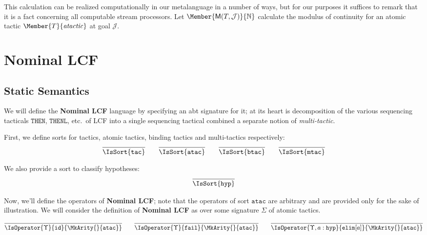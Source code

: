 This calculation can be realized computationally in our metalanguage in a
number of ways, but for our purposes it suffices to remark that it is a fact
concerning all computable stream processors. Let
$\Member{\ModC{T}{\mathcal{J}}}{\MLNat}$ calculate the modulus of continuity
for an atomic tactic $\Member{T}{\LCFAtomicTactic}$ at goal $\mathcal{J}$.

\section{Nominal LCF}

\subsection{Static Semantics}

\newcommand\SortATac{\mathtt{atac}}
\newcommand\SortBTac{\mathtt{btac}}
\newcommand\SortTac{\mathtt{tac}}
\newcommand\SortMTac{\mathtt{mtac}}
\newcommand\SortHyp{\mathtt{hyp}}

We will define the \textbf{Nominal LCF} language by specifying an abt signature
for it; at its heart is decomposition of the various sequencing tacticals
$\mathtt{THEN}$, $\mathtt{THENL}$, etc.\ of LCF into a single sequencing
tactical combined a separate notion of \emph{multi-tactic}.

First, we define sorts for tactics, atomic tactics, binding tactics and multi-tactics
respectively:
\begin{gather*}
  \infer{
    \IsSort{\SortTac}
  }{}
  \qquad
  \infer{
    \IsSort{\SortATac}
  }{}
  \qquad
  \infer{
    \IsSort{\SortBTac}
  }{}
  \qquad
  \infer{
    \IsSort{\SortMTac}
  }{}
\end{gather*}

We also provide a sort to classify hypotheses:
\[
  \infer{
    \IsSort{\SortHyp}
  }{
  }
\]

Now, we'll define the operators of \textbf{Nominal LCF}; note that the
operators of sort $\SortATac$ are arbitrary and are provided only for the sake
of illustration. We will consider the definition of \textbf{Nominal LCF} as
over some signature $\Sigma$ of atomic tactics.

\[
  \infer{
    \IsOperator{\Upsilon}{\mathtt{id}}{
      \MkArity{}{\SortATac}
    }
  }{
  }
  \qquad
  \infer{
    \IsOperator{\Upsilon}{\mathtt{fail}}{
      \MkArity{}{\SortATac}
    }
  }{
  }
  \qquad
  \infer{
    \IsOperator{\Upsilon,a:\SortHyp}{\mathtt{elim}[a]}{
      \MkArity{}{\SortATac}
    }
  }{
  }
\]

